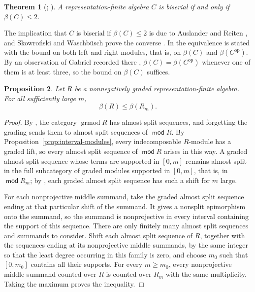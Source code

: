 \documentclass[a4paper,reqno,10pt]{amsart}
\newtheorem{theorem}{Theorem}[section]
\newtheorem{proposition}[theorem]{Proposition}
\theoremstyle{definition}
\numberwithin{equation}{section}
\DeclareMathOperator{\moduleCategory}{\mathsf{mod}}
\renewcommand{\mod}{\moduleCategory}
\newcommand{\op}{\mathrm{op}}
\begin{document}
\begin{theorem}[{\cite[Theorem~4.7]{ARuni}; \cite[p.~172 and Corollary to Theorem~1, p.~173]{SW}}]\label{thm:biserial-ar}
A representation-finite algebra \(C\) is biserial if and only if
\(\beta(C)\leq2\).
\end{theorem}
The implication that \(C\) is biserial if \(\beta(C)\leq2\) is due to Auslander
and Reiten \cite[Theorem~4.7]{ARuni}, and Skowro\'nski and Waschb\"usch
prove the converse \cite[p.~173]{SW}. In \cite{SW} the equivalence is
stated with the bound on both left and right modules, that is, on
\(\beta(C)\) and \(\beta(C^\op)\). By an observation of Gabriel recorded
there \cite[p.~172]{SW}, \(\beta(C)=\beta(C^\op)\) whenever one of them is
at least three, so the bound on \(\beta(C)\) suffices.

\begin{proposition}\label{prop:ar-transfer}
Let \(R\) be a nonnegatively graded representation-finite algebra.
For all sufficiently large \(m\),
\[
 \beta(R)\leq\beta(R_m).
\]
\end{proposition}
\begin{proof}
By \cite[Theorem~3.5]{GG2}, the category \(\operatorname{grmod}R\) has
almost split sequences, and forgetting the grading sends them to almost
split sequences of \(\mod R\). By Proposition~\ref{prop:interval-modules},
every indecomposable \(R\)-module has a graded lift, so every almost split
sequence of \(\mod R\) arises in this way. A graded almost split sequence
whose terms are supported in \([0,m]\) remains almost split in the full
subcategory of graded modules supported in \([0,m]\), that is, in
\(\mod R_m\); by \cite[Lemma~3.6]{GG2}, each graded almost split sequence
has such a shift for \(m\) large.

For each nonprojective middle summand, take the graded almost split
sequence ending at that particular shift of the summand. It gives a
nonsplit epimorphism onto the summand, so the summand is nonprojective in
every interval containing the support of this sequence. There are only
finitely many almost split sequences and summands to consider. Shift each
almost split sequence of \(R\), together with the sequences ending at its
nonprojective middle summands, by the same integer so that the least degree
occurring in this family is zero, and choose
\(m_0\) such that \([0,m_0]\) contains all their supports. For every \(m\geq m_0\), every nonprojective middle summand
counted over \(R\) is counted over \(R_m\) with the same multiplicity.
Taking the maximum proves the inequality.
\end{proof}
\end{document}
